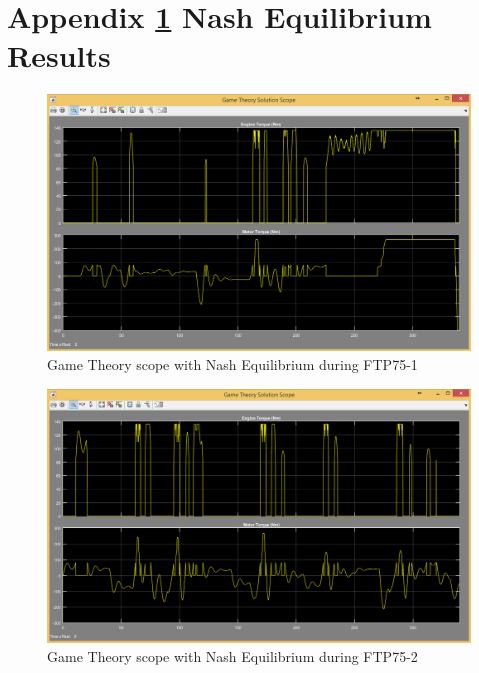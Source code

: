 \appendix
\chapter{Appendix \ref{app:1} Nash Equilibrium Results}
\label{app:1}


\begin{figure}[h]
\centering
\includegraphics[scale=0.45]{figures/NashEquilibrium/FTP75-1/gameTheory13Juni}
\caption{Game Theory scope with Nash Equilibrium during FTP75-1}
\label{fig:gtne1}
\end{figure}



\begin{figure}[h]
\centering
\includegraphics[scale=0.45]{figures/NashEquilibrium/FTP75-2/gameTheory13Juni}
\caption{Game Theory scope with Nash Equilibrium during FTP75-2}
\label{fig:gtne2}
\end{figure}



